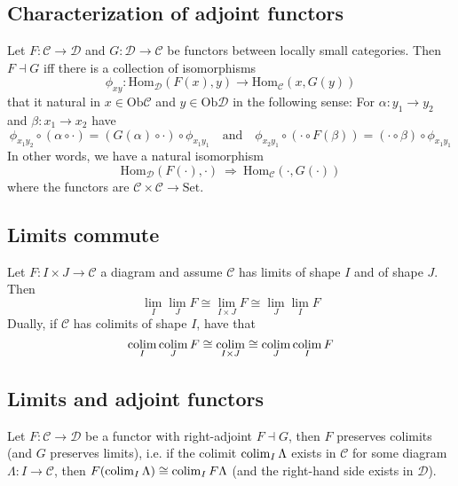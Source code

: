 \subsection{Characterization of adjoint functors}
Let $F: \mathcal{C} \to \mathcal{D}$ and $G: \mathcal{D} \to \mathcal{C}$ be functors between locally small categories.
Then $F \dashv G$ iff there is a collection of isomorphisms
\begin{equation*}
    \phi_{xy}: \mathrm{Hom}_{\mathcal{D}}(F(x), y) \to \mathrm{Hom}_{\mathcal{C}}(x, G(y))
\end{equation*}
that it natural in $x \in \mathrm{Ob}\mathcal{C}$ and $y \in \mathrm{Ob}\mathcal{D}$ in the following sense:
For $\alpha: y_1 \to y_2$ and $\beta: x_1 \to x_2$ have
\begin{equation*}
    \phi_{x_1 y_2} \circ (\alpha \circ \cdot) = (G(\alpha) \circ \cdot) \circ \phi_{x_1 y_1} \quad \text{and} \quad \phi_{x_2 y_1} \circ (\cdot \circ F(\beta)) = (\cdot \circ \beta) \circ \phi_{x_1 y_1}
\end{equation*}
In other words, we have a natural isomorphism
\begin{equation*}
    \mathrm{Hom}_{\mathcal{D}}(F(\cdot), \cdot) \ \Rightarrow \ \mathrm{Hom}_{\mathcal{C}}(\cdot, G(\cdot))
\end{equation*}
where the functors are $\mathcal{C} \times \mathcal{C} \to \mathrm{Set}$.

\subsection{Limits commute}
Let $F: I \times J \to \mathcal{C}$ a diagram and assume $\mathcal{C}$ has limits of shape $I$ and of shape $J$.
Then
\begin{equation*}
    \lim_I \lim_J F \cong \lim_{I \times J} F \cong \lim_J \lim_I F
\end{equation*}
Dually, if $\mathcal{C}$ has colimits of shape $I$, have that
\begin{equation*}
    \operatorname*{colim}_I \operatorname*{colim}_J F \cong \operatorname*{colim}_{I \times J} \cong \operatorname*{colim}_J \operatorname*{colim}_I F
\end{equation*}

\subsection{Limits and adjoint functors}
Let $F: \mathcal{C} \to \mathcal{D}$ be a functor with right-adjoint $F \dashv G$, then $F$ preserves colimits (and $G$ preserves limits), i.e. if the colimit $\operatorname*{colim}_I \Lambda$ exists in $\mathcal{C}$ for some diagram $\Lambda: I \to \mathcal{C}$, then $F(\operatorname*{colim}_I \Lambda) \cong \operatorname*{colim}_I F \Lambda$ (and the right-hand side exists in $\mathcal{D}$). 
